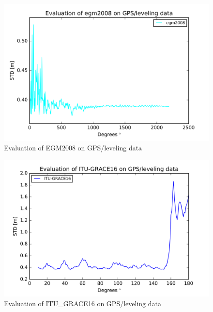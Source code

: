         
        \begin{figure}[t]
        	\caption{Evaluation of EGM2008 on GPS/leveling data}
        	\label{sudan_data}
        	\includegraphics{Figures/egm2008_gps_figure.png}
        	\centering
        \end{figure}
        
        
        \begin{figure}[t]
        	\caption{Evaluation of ITU\_GRACE16 on GPS/leveling data}
        	\label{sudan_data}
        	\includegraphics{Figures/ITU-GRACE16_gps_figure.png}
        	\centering
        \end{figure}
        
